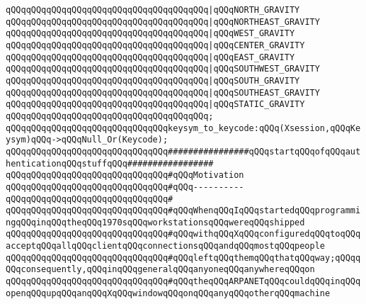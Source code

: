 \verb|qQQqqQQqqQQqqQQqqQQqqQQqqQQqqQQqqQQqqQQq|\verb#|qQQqNORTH_GRAVITY#\newline
\verb|qQQqqQQqqQQqqQQqqQQqqQQqqQQqqQQqqQQqqQQq|\verb#|qQQqNORTHEAST_GRAVITY#\newline
\verb|qQQqqQQqqQQqqQQqqQQqqQQqqQQqqQQqqQQqqQQq|\verb#|qQQqWEST_GRAVITY#\newline
\verb|qQQqqQQqqQQqqQQqqQQqqQQqqQQqqQQqqQQqqQQq|\verb#|qQQqCENTER_GRAVITY#\newline
\verb|qQQqqQQqqQQqqQQqqQQqqQQqqQQqqQQqqQQqqQQq|\verb#|qQQqEAST_GRAVITY#\newline
\verb|qQQqqQQqqQQqqQQqqQQqqQQqqQQqqQQqqQQqqQQq|\verb#|qQQqSOUTHWEST_GRAVITY#\newline
\verb|qQQqqQQqqQQqqQQqqQQqqQQqqQQqqQQqqQQqqQQq|\verb#|qQQqSOUTH_GRAVITY#\newline
\verb|qQQqqQQqqQQqqQQqqQQqqQQqqQQqqQQqqQQqqQQq|\verb#|qQQqSOUTHEAST_GRAVITY#\newline
\verb|qQQqqQQqqQQqqQQqqQQqqQQqqQQqqQQqqQQqqQQq|\verb#|qQQqSTATIC_GRAVITY#\newline
\verb|qQQqqQQqqQQqqQQqqQQqqQQqqQQqqQQqqQQqqQQq;|\newline
\newline
\verb|qQQqqQQqqQQqqQQqqQQqqQQqqQQqqQQqkeysym_to_keycode:qQQq(Xsession,qQQqKeysym)qQQq->qQQqNull_Or(Keycode);|\newline
\newline
\newline
\verb|qQQqqQQqqQQqqQQqqQQqqQQqqQQqqQQq################qQQqstartqQQqofqQQqauthenticationqQQqstuffqQQq#################|\newline
\verb|qQQqqQQqqQQqqQQqqQQqqQQqqQQqqQQq#qQQqMotivation|\newline
\verb|qQQqqQQqqQQqqQQqqQQqqQQqqQQqqQQq#qQQq----------|\newline
\verb|qQQqqQQqqQQqqQQqqQQqqQQqqQQqqQQq#|\newline
\verb|qQQqqQQqqQQqqQQqqQQqqQQqqQQqqQQq#qQQqWhenqQQqIqQQqstartedqQQqprogrammingqQQqinqQQqtheqQQq1970sqQQqworkstationsqQQqwereqQQqshipped|\newline
\verb|qQQqqQQqqQQqqQQqqQQqqQQqqQQqqQQq#qQQqwithqQQqXqQQqconfiguredqQQqtoqQQqacceptqQQqallqQQqclientqQQqconnectionsqQQqandqQQqmostqQQqpeople|\newline
\verb|qQQqqQQqqQQqqQQqqQQqqQQqqQQqqQQq#qQQqleftqQQqthemqQQqthatqQQqway;qQQqqQQqconsequently,qQQqinqQQqgeneralqQQqanyoneqQQqanywhereqQQqon|\newline
\verb|qQQqqQQqqQQqqQQqqQQqqQQqqQQqqQQq#qQQqtheqQQqARPANETqQQqcouldqQQqinqQQqopenqQQqupqQQqanqQQqXqQQqwindowqQQqonqQQqanyqQQqotherqQQqmachine|\newline
